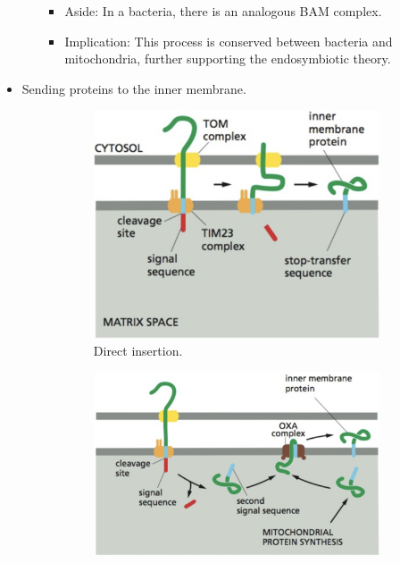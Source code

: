 \documentclass[../notes.tex]{subfiles}
\begin{document}
\begin{itemize}
\begin{itemize}
        \begin{itemize}
            \item Aside: In a bacteria, there is an analogous BAM complex.
            \item Implication: This process is conserved between bacteria and mitochondria, further supporting the endosymbiotic theory.
        \end{itemize}
    \end{itemize}
    \item Sending proteins to the inner membrane.
    \begin{figure}[H]
        \centering
        \begin{subfigure}[b]{0.4\linewidth}
            \centering
            \includegraphics[width=0.8\linewidth]{../ExtFiles/MiTransCytIna.png}
            \caption{Direct insertion.}
            \label{fig:MiTransCytIna}
        \end{subfigure}
        \begin{subfigure}[b]{0.4\linewidth}
            \centering
            \includegraphics[width=0.98\linewidth]{../ExtFiles/MiTransCytInb.png}

\end{subfigure}
\end{figure}
\end{itemize}
\end{document}
